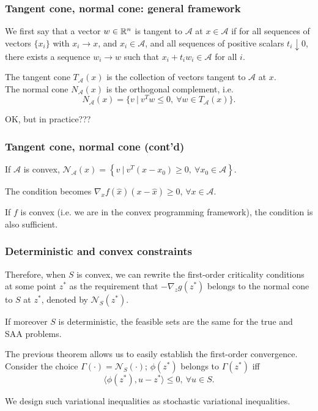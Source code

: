 \documentclass{beamer}
\begin{document}
\begin{frame}
\frametitle{Tangent cone, normal cone: general framework}

We first say that a vector $w \in \mathbb{R}^n$ is tangent to $\mathcal{A}$ at $x \in \mathcal{A}$ if for all sequences of vectors $\lbrace x_i \rbrace$ with $x_i \rightarrow x$, and $x_i \in \mathcal{A}$, and all sequences of positive scalars $t_i \downarrow 0$, there exists a sequence $w_i \rightarrow w$ such that $x_i + t_iw_i \in \mathcal{A}$ for all $i$.

\mbox{}

The {\red tangent cone $T_{\mathcal{A}}(x)$} is the collection of vectors tangent to ${\mathcal{A}}$ at $x$. \\
The {\red normal cone $N_{\mathcal{A}}(x)$} is the orthogonal complement, i.e.
\[
N_{\mathcal{A}}(x) = \lbrace v\ |\ v^Tw \leq 0,\ \forall w \in T_{\mathcal{A}}(x) \rbrace.
\]

\mbox{}

OK, but in practice???

\end{frame}

\begin{frame}
\frametitle{Tangent cone, normal cone (cont'd)}

If ${\mathcal{A}}$ is convex,
$
\mathcal{N}_{\mathcal{A}}(x) = \left\lbrace v\ |\ v^T(x-x_0) \geq 0,\ \forall x_0 \in
{\mathcal{A}} \right\rbrace.
$

\mbox{}

The condition becomes
$\nabla_x f(\hat{x}) (x-\hat{x}) \geq 0$, $\forall x \in {\mathcal{A}}$.

\mbox{}

If $f$ is convex (i.e. we are in the convex programming framework), the condition is also sufficient.

\end{frame}

\begin{frame}
\frametitle{Deterministic and convex constraints}

Therefore, when $S$ is convex, we can rewrite the first-order criticality conditions at some point $z^*$ as the requirement that $-\nabla_z g(z^*)$ belongs to the normal cone to $S$ at $z^*$, denoted by $\mathcal{N}_{S}(z^*)$.

\mbox{}

If moreover $S$ is deterministic, the feasible sets are the same for the true and SAA problems.

\mbox{}

The previous theorem allows us to easily establish the first-order convergence.
Consider the choice $\Gamma(\cdot) = \mathcal{N}_S(\cdot)$; $\phi(z^*)$ belongs to $\Gamma(z^*)$ iff
\[
\langle \phi(z^*), u-z^*\rangle \leq 0,\ \forall u \in S.
\]

We design such variational inequalities as stochastic variational inequalities.

\end{frame}
\end{document}

